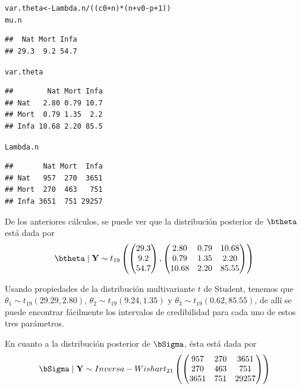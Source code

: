 \documentclass[10pt,openright]{book}\usepackage[]{graphicx}\usepackage[]{color}
\makeatletter
\newcommand{\hlnum}[1]{\textcolor[rgb]{0.686,0.059,0.569}{#1}}%
\newcommand{\hlopt}[1]{\textcolor[rgb]{0,0,0}{#1}}%
\newcommand{\hlstd}[1]{\textcolor[rgb]{0.345,0.345,0.345}{#1}}%
\newcommand{\hlkwb}[1]{\textcolor[rgb]{0.69,0.353,0.396}{#1}}%
\newenvironment{kframe}{%
 \def\at@end@of@kframe{}%
 \ifinner\ifhmode%
  \def\at@end@of@kframe{\end{minipage}}%
  \begin{minipage}{\columnwidth}%
 \fi\fi%
 \def\FrameCommand##1{\hskip\@totalleftmargin \hskip-\fboxsep
 \colorbox{shadecolor}{##1}\hskip-\fboxsep
     \hskip-\linewidth \hskip-\@totalleftmargin \hskip\columnwidth}%
 \MakeFramed {\advance\hsize-\width
   \@totalleftmargin\z@ \linewidth\hsize
   \@setminipage}}%
 {\par\unskip\endMakeFramed%
 \at@end@of@kframe}
\newenvironment{knitrout}{}{} %
\makeatother
\begin{document}
\begin{Eje}
\begin{knitrout}
\begin{kframe}
\begin{alltt}
\hlstd{var.theta} \hlkwb{<-} \hlstd{Lambda.n}\hlopt{/}\hlstd{((c0}\hlopt{+}\hlstd{n)}\hlopt{*}\hlstd{(n}\hlopt{+}\hlstd{v0}\hlopt{-}\hlstd{p}\hlopt{+}\hlnum{1}\hlstd{))}
\hlstd{mu.n}
\end{alltt}
\begin{verbatim}
##  Nat Mort Infa 
## 29.3  9.2 54.7
\end{verbatim}
\begin{alltt}
\hlstd{var.theta}
\end{alltt}
\begin{verbatim}
##        Nat Mort Infa
## Nat   2.80 0.79 10.7
## Mort  0.79 1.35  2.2
## Infa 10.68 2.20 85.5
\end{verbatim}
\begin{alltt}
\hlstd{Lambda.n}
\end{alltt}
\begin{verbatim}
##       Nat Mort  Infa
## Nat   957  270  3651
## Mort  270  463   751
## Infa 3651  751 29257
\end{verbatim}
\end{kframe}
\end{knitrout}

De los anteriores c\'alculos, se puede ver que la distribuci\'on posterior de $\btheta$ est\'a dada por
\begin{equation*}
\btheta\mid\mathbf{Y}\sim t_{19}\left(\begin{pmatrix}29.3\\9.2\\54.7\end{pmatrix}, \begin{pmatrix}2.80&0.79&10.68\\0.79&1.35&2.20\\10.68&2.20&85.55\end{pmatrix}\right)
\end{equation*}

Usando propiedades de la distribuci\'on multivariante $t$ de Student, tenemos que $\theta_1\sim t_{19}(29.29, 2.80)$, $\theta_2\sim t_{19}(9.24, 1.35)$ y $\theta_3\sim t_{19}(0.62, 85.55)$, de all\'i se puede encontrar f\'acilmente los intervalos de credibilidad para cada uno de estos tres par\'ametros.

En cuanto a la distribuci\'on posterior de $\bSigma$, \'esta est\'a dada por
\begin{equation*}
\bSigma\mid\mathbf{Y}\sim Inversa-Wishart_{21}\left(\begin{pmatrix}957&270&3651\\ 270&463&751\\ 3651&751&29257\end{pmatrix}\right)
\end{equation*}


\end{Eje}
\end{document}
